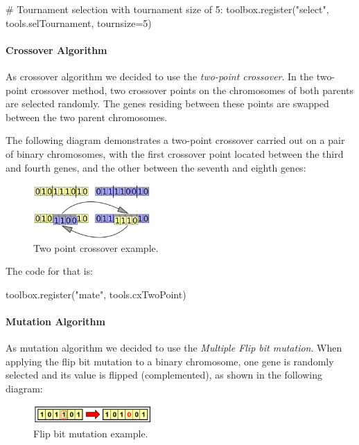\begin{python}
# Tournament selection with tournament size of 5:
toolbox.register("select", tools.selTournament, tournsize=5)
\end{python}


\paragraph{Crossover Algorithm}
As crossover algorithm we decided to use the \textit{two-point crossover}. In the two-point crossover method, two crossover points on the chromosomes of both parents are selected randomly. The genes residing between these points are swapped between the two parent chromosomes.

The following diagram demonstrates a two-point crossover carried out on a pair of binary chromosomes, with the first crossover point located between the third and fourth genes, and the other between the seventh and eighth genes:

\begin{figure}[H]
	\centering
	\includegraphics[width=0.4\textwidth]{img/twopointcross.png}
	\caption{Two point crossover example.}
	\label{fig:twopointcross}
\end{figure}

The code for that is:
\begin{python}
toolbox.register("mate", tools.cxTwoPoint)
\end{python}

\paragraph{Mutation Algorithm}
As mutation algorithm we decided to use the \textit{Multiple Flip bit mutation}. When applying the flip bit mutation to a binary chromosome, one gene is randomly selected and its value is flipped (complemented), as shown in the following diagram:

\begin{figure}[H]
	\centering
	\includegraphics[width=0.4\textwidth]{img/flipbit.png}
	\caption{Flip bit mutation example.}
	\label{fig:flipbit}
\end{figure}

